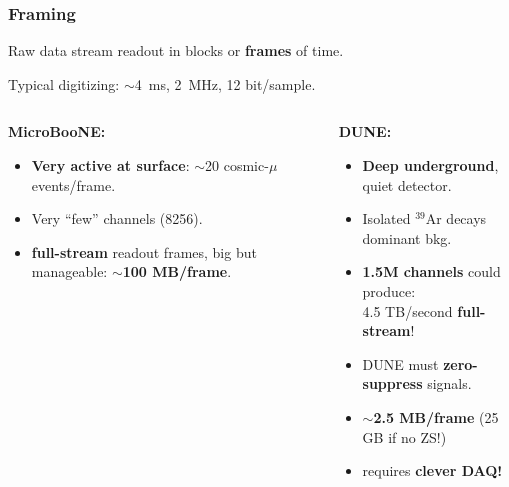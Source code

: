 \documentclass[xcolor=dvipsnames]{beamer}
\begin{document}
\begin{frame}
  \frametitle{Framing}
  
  \vspace{-2.0cm}
  \begin{center}
  \end{center}
  \vspace{-1.0cm}

  \scriptsize
  Raw data stream readout in blocks or \textbf{frames} of time.

  Typical digitizing: $\sim$\SI{4}{\milli\second}, \SI{2}{\mega\hertz}, 12 bit/sample.

  \begin{columns}
    \begin{column}{0.5\textwidth}
      \scriptsize
      \textbf{MicroBooNE:}
      \begin{itemize}
      \item \textbf{Very active at surface}: $\sim$20 cosmic-$\mu$ events/frame.
      \item Very ``few'' channels (8256).
      \item \textbf{full-stream} readout frames, big but manageable:
        \textbf{$\sim$100 MB/frame}.
      \end{itemize}

    \end{column}
    \begin{column}{0.5\textwidth}
      \scriptsize
      
      \textbf{DUNE:}
      \begin{itemize}
      \item \textbf{Deep underground}, quiet detector.
      \item Isolated $^{39}$Ar decays dominant bkg.
      \item \textbf{1.5M channels} could produce: \\
        4.5 TB/second \textbf{full-stream}!
      \item DUNE must \textbf{zero-suppress} signals.
      \item \textbf{$\sim$2.5 MB/frame} (25 GB if no ZS!)
      \item requires \textbf{clever DAQ!}
      \end{itemize}

    \end{column}
  \end{columns}
\end{frame}
\end{document}
